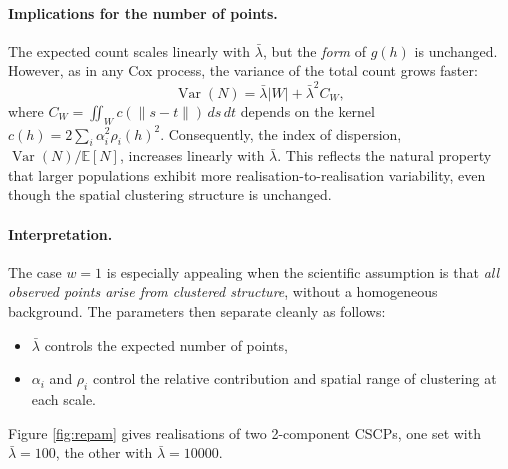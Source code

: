 \documentclass[11pt]{article}
\begin{document}
\paragraph{Implications for the number of points.}
The expected count scales linearly with $\bar\lambda$, but the \emph{form} of
$g(h)$ is unchanged. However, as in any Cox process, the variance of the total
count grows faster:
\[
\operatorname{Var}(N) = \bar\lambda|W| + \bar\lambda^2 C_W,
\]
where $C_W=\iint_W c(\|s-t\|)\,ds\,dt$ depends on the kernel $c(h)=2\sum_i
\alpha_i^2\rho_i(h)^2$. Consequently, the index of dispersion,
$\operatorname{Var}(N)/\mathbb E[N]$, increases linearly with $\bar\lambda$.
This reflects the natural property that larger populations exhibit more
realisation-to-realisation variability, even though the spatial clustering
structure is unchanged.

\paragraph{Interpretation.}
The case $w=1$ is especially appealing when the scientific assumption is that
\emph{all observed points arise from clustered structure}, without a
homogeneous background. The parameters then separate cleanly as follows:
\begin{itemize}
	\item $\bar\lambda$ controls the expected number of points,
	\item $\alpha_i$ and $\rho_i$ control the relative contribution and spatial
	range of clustering at each scale.
\end{itemize}

Figure \ref{fig:repam} gives realisations of two 2-component CSCPs, one set with $\bar{\lambda}=100$, the other with $\bar{\lambda}=10000$.
\end{document}
